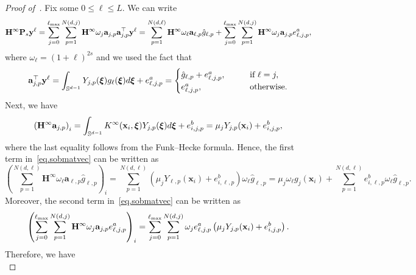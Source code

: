 \begin{proof}[Proof of~]
Fix some $0 \leq \ell \leq L$. We can write
\begin{equation}\label{eq.sobmatvec}
    {\mathbf{H}}^\infty \mathbf{P}_s \mathbf{y}^\ell = \sum_{j = 0}^{\ell_{\text{max}}} \sum_{p=1}^{N(d,j)} \mathbf{H}^\infty \omega_{j} \mathbf{a}_{j,p} \mathbf{a}_{j,p}^\top \mathbf{y}^\ell = \sum_{p=1}^{N(d,\ell)} \mathbf{H}^\infty \omega_{\ell} \mathbf{a}_{\ell,p} \hat{g}_{\ell,p} + \sum_{j = 0}^{\ell_{\text{max}}} \sum_{p=1}^{N(d,j)} \mathbf{H}^\infty \omega_{j} \mathbf{a}_{j,p} e^a_{\ell,j,p},
\end{equation}
where $\omega_\ell = (1+\ell)^{2s}$ and we used the fact that
\begin{align*}
    \mathbf{a}_{j,p}^\top \mathbf{y}^\ell = \int_{{\mathbb{S}}^{d-1}} Y_{j,p}(\boldsymbol{\xi}) g_\ell(\boldsymbol{\xi}) d\boldsymbol{\xi} + e^a_{\ell,j,p} = 
    \begin{cases}
    \hat{g}_{\ell,p} + e^a_{\ell,j,p},& \qquad \text{if } \ell = j, \\
    e^a_{\ell,j,p},& \qquad \text{otherwise}.
    \end{cases}
\end{align*}
Next, we have
\begin{align*}
    \left(\mathbf{H}^\infty \mathbf{a}_{j,p}\right)_i = \int_{{\mathbb{S}}^{d-1}} K^\infty(\mathbf{x}_i, \boldsymbol{\xi}) Y_{j,p}(\boldsymbol{\xi}) d\boldsymbol{\xi} + e_{i,j,p}^b = \mu_j Y_{j,p}(\mathbf{x}_i) + e_{i,j,p}^b,
\end{align*}
where the last equality follows from the Funk--Hecke formula. Hence, the first term in~\cref{eq.sobmatvec} can be written as
\begin{equation*}
    \left(\sum_{p=1}^{N(d,\ell)} \mathbf{H}^\infty \omega_{\ell} \mathbf{a}_{\ell,p} \hat{g}_{\ell,p}\right)_i = \sum_{p=1}^{N(d,\ell)} (\mu_j Y_{\ell,p}(\mathbf{x}_i) + e_{i,\ell,p}^b) \omega_\ell \hat{g}_{\ell,p} = \mu_j \omega_\ell g_j(\mathbf{x}_i) + \sum_{p=1}^{N(d,\ell)} e_{i,\ell,p}^b \omega_\ell \hat{g}_{\ell,p}.
\end{equation*}
Moreover, the second term in~\cref{eq.sobmatvec} can be written as
\begin{align*}
    \left(\sum_{j = 0}^{\ell_{\text{max}}} \sum_{p=1}^{N(d,j)} \mathbf{H}^\infty \omega_{j} \mathbf{a}_{j,p} e^a_{\ell,j,p}\right)_i = \sum_{j = 0}^{\ell_{\text{max}}} \sum_{p=1}^{N(d,j)} \omega_{j} e^a_{\ell,j,p} \left(\mu_j Y_{j,p}(\mathbf{x}_i) + e_{i,j,p}^b\right).
\end{align*}
Therefore, we have
\begin{equation}\label{eq.soboneit}

\end{equation}
\end{proof}
